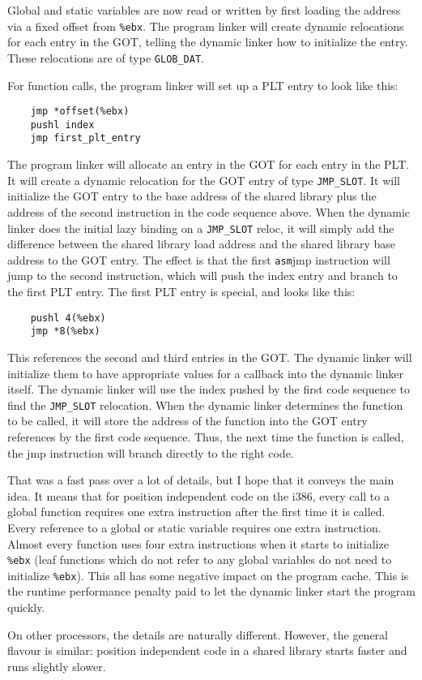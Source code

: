 Global and static variables are now read or written by first loading
the address via a fixed offset from \texttt{\%ebx}. The program linker will
create dynamic relocations for each entry in the GOT, telling the dynamic
linker how to initialize the entry. These relocations are of type
\texttt{GLOB\_DAT}\@.

For function calls, the program linker will set up a PLT entry to look
like this:

\begin{lstlisting}
    jmp *offset(%ebx)
    pushl index
    jmp first_plt_entry
\end{lstlisting}

The program linker will allocate an entry in the GOT for each entry
in the PLT\@. It will create a dynamic relocation for the GOT entry
of type \texttt{JMP\_SLOT}\@. It will initialize the GOT entry to the
base address of the shared library plus the address of the second
instruction in the code sequence above. When the dynamic linker does
the initial lazy binding on a \texttt{JMP\_SLOT} reloc, it will simply add
the difference between the shared library load address and the shared
library base address to the GOT entry. The effect is that the first
\texttt{asm}{jmp} instruction will jump to the second instruction,
which will push the index entry and branch to the first PLT entry. The
first PLT entry is special, and looks like this:

\begin{lstlisting}
    pushl 4(%ebx)
    jmp *8(%ebx)
\end{lstlisting}

This references the second and third entries in the GOT\@. The dynamic
linker will initialize them to have appropriate values for a callback
into the dynamic linker itself. The dynamic linker will use the
index pushed by the first code sequence to find the \texttt{JMP\_SLOT}
relocation. When the dynamic linker determines the function to be
called, it will store the address of the function into the GOT entry
references by the first code sequence. Thus, the next time the function
is called, the jmp instruction will branch directly to the right code.

That was a fast pass over a lot of details, but I hope that it conveys
the main idea. It means that for position independent code on the i386,
every call to a global function requires one extra instruction after the
first time it is called. Every reference to a global or static variable
requires one extra instruction. Almost every function uses four extra
instructions when it starts to initialize \texttt{\%ebx} (leaf
functions which do not refer to any global variables do not need to
initialize \texttt{\%ebx}). This all has some negative impact on
the program cache. This is the runtime performance penalty paid to let
the dynamic linker start the program quickly.

On other processors, the details are naturally different. However,
the general flavour is similar: position independent code in a shared
library starts faster and runs slightly slower.
